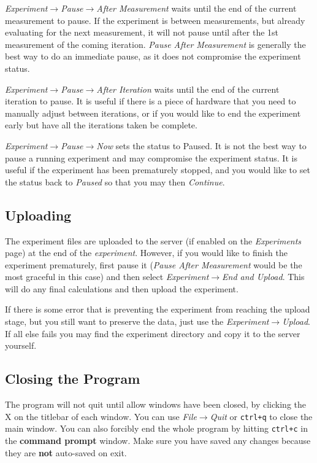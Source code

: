 \documentclass[pdftex,11pt,letterpaper]{article}
\begin{document}
\textit{Experiment}$\rightarrow$\textit{Pause}$\rightarrow$\textit{After Measurement} waits until the end of the current measurement to pause.  If the experiment is between measurements, but already evaluating for the next measurement, it will not pause until after the 1st measurement of the coming iteration.  \textit{Pause After Measurement} is generally the best way to do an immediate pause, as it does not compromise the experiment status.

\textit{Experiment}$\rightarrow$\textit{Pause}$\rightarrow$\textit{After Iteration} waits until the end of the current iteration to pause.  It is useful if there is a piece of hardware that you need to manually adjust between iterations, or if you would like to end the experiment early but have all the iterations taken be complete.

\textit{Experiment}$\rightarrow$\textit{Pause}$\rightarrow$\textit{Now} sets the status to Paused.  It is not the best way to pause a running experiment and may compromise the experiment status.  It is useful if the experiment has been prematurely stopped, and you would like to set the status back to \textit{Paused} so that you may then \textit{Continue}.

\subsection{Uploading}

The experiment files are uploaded to the server (if enabled on the \textit{Experiments} page) at the end of the \textit{experiment}.  However, if you would like to finish the experiment prematurely, first pause it (\textit{Pause After Measurement} would be the most graceful in this case) and then select \textit{Experiment}$\rightarrow$\textit{End and Upload}.  This will do any final calculations and then upload the experiment.

If there is some error that is preventing the experiment from reaching the upload stage, but you still want to preserve the data, just use the \textit{Experiment}$\rightarrow$\textit{Upload}.  If all else fails you may find the experiment directory and copy it to the server yourself.

\subsection{Closing the Program}

The program will not quit until allow windows have been closed, by clicking the X on the titlebar of each window.  You can use \textit{File}$\rightarrow$\textit{Quit} or \texttt{ctrl+q} to close the main window.  You can also forcibly end the whole program by hitting \texttt{ctrl+c} in the \textbf{command prompt} window.  Make sure you have saved any changes because they are \textbf{not} auto-saved on exit.
\end{document}
